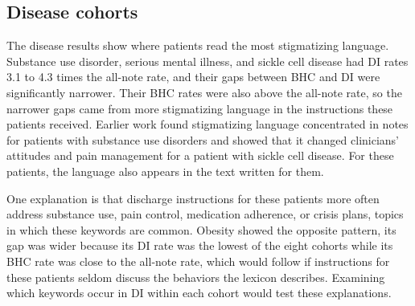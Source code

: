 \documentclass[unnumsec,webpdf,contemporary,large]{oup-authoring-template}
\newcommand{\td}[1]{\sethlcolor{pink}\hl{[Ting: #1]}}
\begin{document}


\subsection{Disease cohorts}

The disease results show where patients read the most stigmatizing language. Substance use disorder, serious mental illness, and sickle cell disease had DI rates 3.1 to 4.3 times the all-note rate, and their gaps between BHC and DI were significantly narrower. Their BHC rates were also above the all-note rate, so the narrower gaps came from more stigmatizing language in the instructions these patients received. Earlier work found stigmatizing language concentrated in notes for patients with substance use disorders and showed that it changed clinicians' attitudes and pain management for a patient with sickle cell disease.\cite{himmelstein2022,goddu2018} For these patients, the language also appears in the text written for them.

One explanation is that discharge instructions for these patients more often address substance use, pain control, medication adherence, or crisis plans, topics in which these keywords are common. Obesity showed the opposite pattern, its gap was wider because its DI rate was the lowest of the eight cohorts while its BHC rate was close to the all-note rate, which would follow if instructions for these patients seldom discuss the behaviors the lexicon describes. Examining which keywords occur in DI within each cohort would test these explanations.
\end{document}
